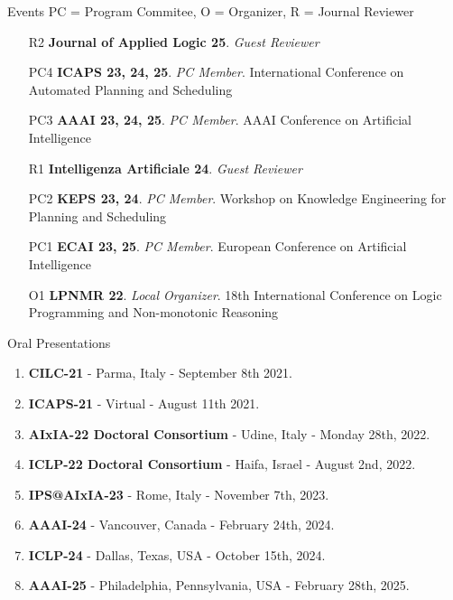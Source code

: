 \documentclass{resume} %
\begin{document}
\begin{rSection}{Events {\tiny PC = Program Commitee, O = Organizer, R = Journal Reviewer}} 
\begin{enumerate}[leftmargin=5mm]
\item[R2] \textbf{Journal of Applied Logic 25}. \textit{Guest Reviewer} 
\item[PC4] \textbf{ICAPS 23, 24, 25}. \textit{PC Member}. International Conference on Automated Planning and Scheduling 
\item[PC3] \textbf{AAAI 23, 24, 25}. \textit{PC Member}. AAAI Conference on Artificial Intelligence 
\item[R1] \textbf{Intelligenza Artificiale 24}. \textit{Guest Reviewer} 
\item[PC2]\textbf{KEPS 23, 24}. \textit{PC Member}. Workshop on Knowledge Engineering for Planning and Scheduling 
\item[PC1] \textbf{ECAI 23, 25}. \textit{PC Member}. European Conference on Artificial Intelligence 
\item[O1] \textbf{LPNMR 22}. \textit{Local Organizer}. 18th International Conference on Logic Programming and Non-monotonic Reasoning  
\end{enumerate}
\end{rSection}

\begin{rSection}{Oral Presentations}
\begin{enumerate}[leftmargin=5mm]
\item \textbf{CILC-21} - Parma, Italy -  September 8th 2021.
\item \textbf{ICAPS-21} - Virtual - August 11th 2021.
\item \textbf{AIxIA-22 Doctoral Consortium} - Udine, Italy - Monday 28th, 2022.
\item \textbf{ICLP-22 Doctoral Consortium} - Haifa, Israel - August 2nd, 2022.
\item \textbf{IPS@AIxIA-23} - Rome, Italy -  November 7th, 2023.
\item \textbf{AAAI-24} - Vancouver, Canada -  February 24th, 2024.
\item \textbf{ICLP-24} - Dallas, Texas, USA -  October 15th, 2024.
\item \textbf{AAAI-25} - Philadelphia, Pennsylvania, USA -  February 28th, 2025.
\end{enumerate}
\end{rSection}
\end{document}
